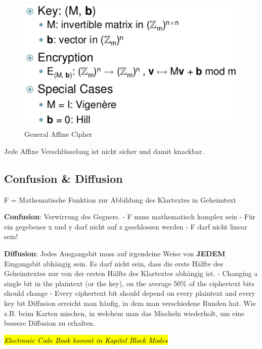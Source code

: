 \begin{figure}[H]
\centering
\includegraphics{figures/generalAffineCipher.png}
\caption{General Affine Cipher}
\end{figure}

\begin{tcolorbox}[colback=red!5!white,colframe=red!75!black]
    Jede Affine Verschlüsselung ist nicht sicher und damit knackbar.
\end{tcolorbox}

\hypertarget{confusion-diffusion}{%
\subsection{Confusion \& Diffusion}\label{confusion-diffusion}}

F = Mathematische Funktion zur Abbildung des Klartextes in Geheimtext

\textbf{Confusion}: Verwirrung des Gegners. - F muss mathematisch
komplex sein - Für ein gegebenes x und y darf nicht auf z geschlossen
werden - F darf nicht linear sein!

\textbf{Diffusion}: Jedes Ausgangsbit muss auf irgendeine Weise von
\textbf{JEDEM} Eingangsbit abhängig sein. Es darf nicht sein, dass die erste
Hälfte des Geheimtextes nur von der ersten Hälfte des Klartextes
abhängig ist. - Changing a single bit in the plaintext (or the key), on
the average 50\% of the ciphertext bits should change - Every ciphertext
bit should depend on every plaintext and every key bit
\newline
\newline
Diffusion erreicht man häufig, in dem man verschiedene Runden hat. Wie
z.B. beim Karten mischen, in welchem man das Mischeln wiederholt, um
eine bessere Diffusion zu erhalten.

\textit{\hl{Electronic Code Book kommt in Kapitel Block Modes}}

\clearpage